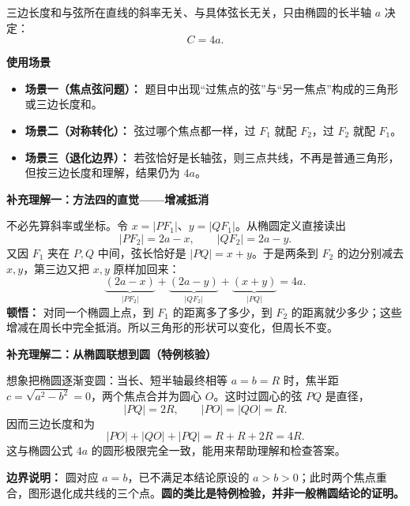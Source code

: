 \begin{explanationbox}
	三边长度和与弦所在直线的斜率无关、与具体弦长无关，只由椭圆的长半轴 $a$ 决定：
	\[
		C=4a.
	\]

	\medskip
	\textbf{\textcolor{CExplanation}{使用场景}}
	\begin{itemize}[leftmargin=*, itemsep=0.5em, topsep=0.4em]
		\item \textbf{场景一（焦点弦问题）：} 题目中出现“过焦点的弦”与“另一焦点”构成的三角形或三边长度和。
		\item \textbf{场景二（对称转化）：} 弦过哪个焦点都一样，过 $F_1$ 就配 $F_2$，过 $F_2$ 就配 $F_1$。
		\item \textbf{场景三（退化边界）：} 若弦恰好是长轴弦，则三点共线，不再是普通三角形，但按三边长度和理解，结果仍为 $4a$。
	\end{itemize}


\medskip
\textbf{\textcolor{CExplanation}{补充理解一：方法四的直觉——增减抵消}}

不必先算斜率或坐标。令 $x=|PF_1|$、$y=|QF_1|$。从椭圆定义直接读出
\[
 |PF_2|=2a-x,\qquad |QF_2|=2a-y.
\]
又因 $F_1$ 夹在 $P,Q$ 中间，弦长恰好是 $|PQ|=x+y$。于是两条到 $F_2$ 的边分别减去 $x,y$，第三边又把 $x,y$ 原样加回来：
\[
 \underbrace{(2a-x)}_{|PF_2|}
 +\underbrace{(2a-y)}_{|QF_2|}
 +\underbrace{(x+y)}_{|PQ|}=4a.
\]
\textbf{顿悟：} 对同一个椭圆上点，到 $F_1$ 的距离多了多少，到 $F_2$ 的距离就少多少；这些增减在周长中完全抵消。所以三角形的形状可以变化，但周长不变。

\medskip
\textbf{\textcolor{CExplanation}{补充理解二：从椭圆联想到圆（特例核验）}}

想象把椭圆逐渐变圆：当长、短半轴最终相等 $a=b=R$ 时，焦半距 $c=\sqrt{a^2-b^2}=0$，两个焦点合并为圆心 $O$。这时过圆心的弦 $PQ$ 是直径，
\[
 |PQ|=2R,\qquad |PO|=|QO|=R.
\]
因而三边长度和为
\[
 |PO|+|QO|+|PQ|=R+R+2R=4R.
\]
这与椭圆公式 $4a$ 的圆形极限完全一致，能用来帮助理解和检查答案。

\textbf{边界说明：} 圆对应 $a=b$，已不满足本结论原设的 $a>b>0$；此时两个焦点重合，图形退化成共线的三个点。\textbf{圆的类比是特例检验，并非一般椭圆结论的证明。}
\end{explanationbox}